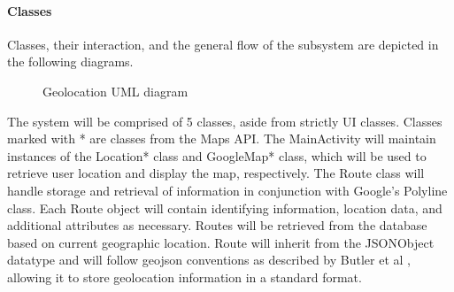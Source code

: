 ﻿\documentclass{article}
\begin{document}
\paragraph{Classes}
Classes, their interaction, and the general flow of the subsystem are depicted in the following diagrams.

\begin{figure}[H]
    \centering
    \begin{center}
    \end{center}
    \caption{Geolocation UML diagram}
    \label{fig:my_label}
\end{figure}

The system will be comprised of 5 classes, aside from strictly UI classes. Classes marked with * are classes from the Maps API. The MainActivity will maintain instances of the Location* class and GoogleMap* class, which will be used to retrieve user location and display the map, respectively. The Route class will handle storage and retrieval of information in conjunction with Google's Polyline class. Each Route object will contain identifying information, location data, and additional attributes as necessary. Routes will be retrieved from the database based on current geographic location. Route will inherit from the JSONObject datatype and will follow geojson conventions as described by Butler et al \cite{g_geojson_std}, allowing it to store geolocation information in a standard format.
\end{document}
